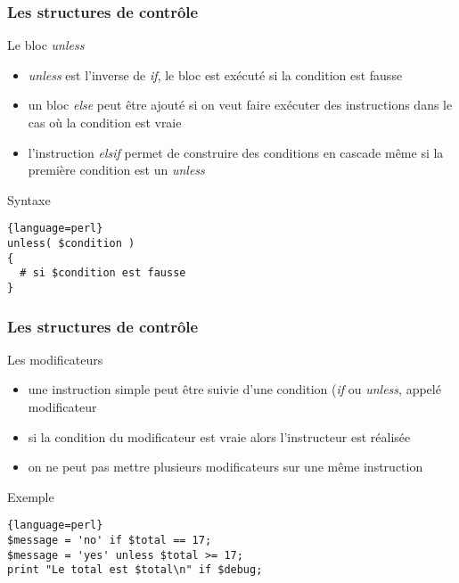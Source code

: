 \begin{frame}[fragile]
  \frametitle{Les structures de contrôle}

  \begin{block}{Le bloc \textit{unless}}
    \begin{itemize}
    \item \textit{unless} est l'inverse de \textit{if}, le bloc est exécuté si
      la condition est fausse
    \item un bloc \textit{else} peut être ajouté si on veut faire exécuter
      des instructions dans le cas où la condition est vraie
    \item l'instruction \textit{elsif} permet de construire des conditions
      en cascade même si la première condition est un \textit{unless}
    \end{itemize}
  \end{block}

  \begin{alertblock}{Syntaxe}
    \begin{lstlisting}{language=perl}
unless( $condition )
{
  # si $condition est fausse
}
    \end{lstlisting}
  \end{alertblock}

\end{frame}

\begin{frame}[fragile]
  \frametitle{Les structures de contrôle}

  \begin{block}{Les modificateurs}
    \begin{itemize}
    \item une instruction simple peut être suivie d'une condition (\textit{if}
      ou \textit{unless}, appelé modificateur
    \item si la condition du modificateur est vraie alors l'instructeur
      est réalisée
    \item on ne peut pas mettre plusieurs modificateurs sur une même
      instruction
    \end{itemize}
  \end{block}

  \begin{exampleblock}{Exemple}
    \begin{lstlisting}{language=perl}
$message = 'no' if $total == 17;
$message = 'yes' unless $total >= 17;
print "Le total est $total\n" if $debug;
    \end{lstlisting}
  \end{exampleblock}

\end{frame}

